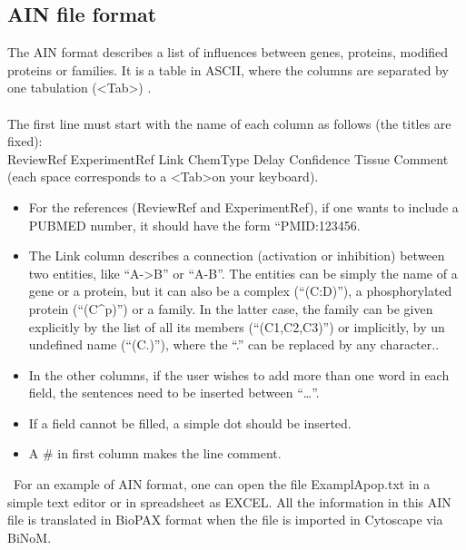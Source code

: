 \subsection{AIN file format}\label{AIN_file_format}
The AIN format describes a list of influences between genes, proteins, modified proteins or families. It is a table in ASCII, where the columns are separated by one tabulation (\textless Tab\textgreater) .\\\\
The first line must start with the name of each column as follows (the titles are fixed):\\
ReviewRef ExperimentRef Link ChemType Delay Confidence Tissue Comment\\
(each space corresponds to a \textless Tab\textgreater on your keyboard).
\begin{itemize}
\item For the references (ReviewRef and ExperimentRef), if one wants to include a PUBMED number, it should have the form “PMID:123456.
\item The Link column describes a connection (activation or inhibition) between two entities, like “A-\textgreater B” or “A-\textbar B”. The entities can be simply the name of a gene or a protein, but it can also be a complex (“(C:D)”), a phosphorylated protein (“(C\textasciicircum p)”) or a family. In the latter case, the family can be given explicitly by the list of all its members (“(C1,C2,C3)”) or implicitly, by un undefined name (“(C.)”), where the “.” can be replaced by any character..
\item In the other columns, if the user wishes to add more than one word in each field, the sentences need to be inserted between “…”.
\item If a field cannot be filled, a simple dot should be inserted.
\item A \# in first column makes the line comment.
\end{itemize}\
For an example of AIN format, one can open the file ExamplApop.txt in a simple text editor or in spreadsheet as EXCEL. All the information in this AIN file is translated in BioPAX format when the file is imported in Cytoscape via BiNoM.

